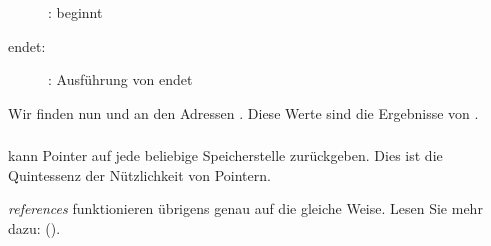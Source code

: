 \begin{figure}[H]
\centering
{}
\caption{\olly: \ttfone beginnt}
\label{fig:pointers_olly_stk_2}
\end{figure}

\clearpage
\ttfone endet:

\begin{figure}[H]
\centering
{}
\caption{\olly: Ausführung von \ttfone endet}
\label{fig:pointers_olly_stk_3}
\end{figure}
Wir finden nun  und  an den Adressen \PtrsAddresses.
Diese Werte sind die Ergebnisse von \ttfone.

\subsubsection{\Conclusion{}}
\ttfone kann Pointer auf jede beliebige Speicherstelle zurückgeben.
Dies ist die Quintessenz der Nützlichkeit von Pointern. 
 
\Cpp \emph{references} funktionieren übrigens genau auf die gleiche Weise. Lesen Sie mehr dazu: ().
